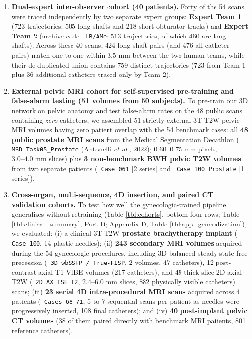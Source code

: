\documentclass[
  11pt,
]{article}
\let\nforigtexttt\texttt
\renewcommand{\texttt}[1]{\nforigtexttt{\XeTeXinterchartokenstate=1 #1}}
\begin{document}
\begin{enumerate}
  54 patients).
\item
  \textbf{Dual-expert inter-observer cohort (40 patients).} Forty of the
  54 scans were traced independently by two separate expert groups:
  \textbf{Expert Team 1} (723 trajectories: 505 long shafts and 218
  short obturator tracks) and \textbf{Expert Team 2} (archive code
  \texttt{LB/AMe}: 513 trajectories, of which 460 are long shafts).
  Across these 40 scans, 424 long-shaft pairs (and 476 all-catheter
  pairs) match one-to-one within \(3.5\text{ mm}\) between the two human
  teams, while their de-duplicated union contains 759 distinct
  trajectories (\(723\) from Team 1 plus \(36\) additional catheters
  traced only by Team 2).
\item
  \textbf{External pelvic MRI cohort for self-supervised pre-training
  and false-alarm testing (51 volumes from 50 subjects).} To pre-train
  our 3D network on pelvic anatomy and test false-alarm rates on the 48
  public scans containing \emph{zero} catheters, we assembled 51
  strictly external 3T T2W pelvic MRI volumes having zero patient
  overlap with the 54 benchmark cases: all \textbf{48 public prostate
  MRI scans} from the Medical Segmentation Decathlon
  (\texttt{MSD\ Task05\_Prostate} (Antonelli \emph{et al.}, 2022);
  \(0.60\text{--}0.75\text{ mm}\) pixels, \(3.0\text{--}4.0\text{ mm}\)
  slices) plus \textbf{3 non-benchmark BWH pelvic T2W volumes} from two
  separate patients (\texttt{Case\ 061} {[}2 series{]} and
  \texttt{Case\ 100\ Prostate} {[}1 series{]}).
\item
  \textbf{Cross-organ, multi-sequence, 4D insertion, and paired CT
  validation cohorts.} To test how well the gynecologic-trained pipeline
  generalizes without retraining (Table \ref{tbl:cohorts}, bottom four
  rows; Table \ref{tbl:clinical_summary}, Part D; Appendix D, Table
  \ref{tbl:app_generalization}), we evaluated: (i) a clinical 3T T2W
  \textbf{prostate brachytherapy implant} (\texttt{Case\ 100}, 14
  plastic needles); (ii) \textbf{243 secondary MRI volumes} acquired
  during the 54 gynecologic procedures, including 3D balanced
  steady-state free precession (\texttt{3D\ wbSSFP\ /\ True-FISP}, 2
  volumes, 47 catheters), 12 post-contrast axial T1 VIBE volumes (217
  catheters), and 49 thick-slice 2D axial T2W (\texttt{2D\ AX\ TSE\ T2},
  \(2.4\text{--}6.0\text{ mm}\) slices, 882 physically visible
  catheters) scans; (iii) \textbf{23 serial 4D intra-procedural MRI
  scans} acquired across 4 patients (\texttt{Cases\ 68–71}, 5 to 7
  sequential scans per patient as needles were progressively inserted,
  108 final catheters); and (iv) \textbf{40 post-implant pelvic CT
  volumes} (38 of them paired directly with benchmark MRI patients, 801
  reference catheters).
\end{enumerate}
\end{document}
